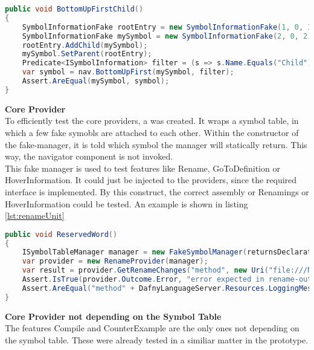 \begin{lstlisting}[language=csharp, caption={Navigator Unit Test}, captionpos=b, label={lst:botuptest}]
public void BottomUpFirstChild()
{
    SymbolInformationFake rootEntry = new SymbolInformationFake(1, 0, 1, 0, 5, 0, defaultFile, "Parent");
    SymbolInformationFake mySymbol = new SymbolInformationFake(2, 0, 2, 0, 5, 0, defaultFile, "Child");
    rootEntry.AddChild(mySymbol);
    mySymbol.SetParent(rootEntry);
    Predicate<ISymbolInformation> filter = (s => s.Name.Equals("Child"));
    var symbol = nav.BottomUpFirst(mySymbol, filter);
    Assert.AreEqual(mySymbol, symbol);
}
\end{lstlisting}

\textbf{Core Provider}\\
To efficiently test the core providers, a  was created.
It wraps a symbol table, in which a few fake symobls are attached to each other.
Within the constructor of the fake-manager, it is told which symbol the manager will statically return.
This way, the navigator component is not invoked.\\

This fake manager is used to test features like Rename, GoToDefinition or HoverInformation.
It could just be injected to the providers, since the required interface  is implemented.
By this construct, the correct assembly or Renamings or HoverInformation could be tested.
An example is shown in listing \ref{lst:renameUnit}

\begin{lstlisting}[language=csharp, caption={Core Provider Unit Test}, captionpos=b, label={lst:renameUnit}]
public void ReservedWord()
{
    ISymbolTableManager manager = new FakeSymbolManager(returnsDeclaration: false, returnsNull: false);
    var provider = new RenameProvider(manager);
    var result = provider.GetRenameChanges("method", new Uri("file:///N:/u/l.l"), 2, 22);
    Assert.IsTrue(provider.Outcome.Error, "error expected in rename-outcome");
    Assert.AreEqual("method" + DafnyLanguageServer.Resources.LoggingMessages.rename_reserved_word, provider.Outcome.Msg);
}
\end{lstlisting}

\textbf{Core Provider not depending on the Symbol Table}\\
The features Compile and CounterExample are the only ones not depending on the symbol table.
These were already tested in a similiar matter in the prototype.\\

